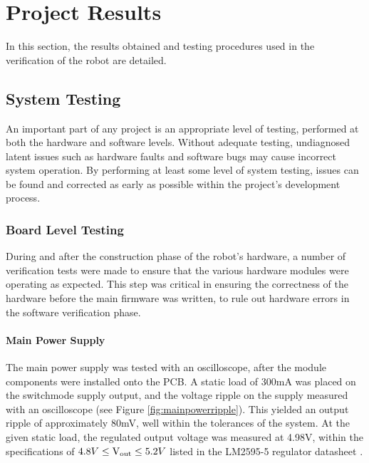 \chapter{Project Results}
\label{chp:results}

In this section, the results obtained and testing procedures used in the verification of the robot are detailed.

\section{System Testing}

An important part of any project is an appropriate level of testing, performed at both the hardware and software levels. Without adequate testing, undiagnosed latent issues such as hardware faults and software bugs may cause incorrect system operation. By performing at least some level of system testing, issues can be found and corrected as early as possible within the project's development process.

\subsection{Board Level Testing}

During and after the construction phase of the robot's hardware, a number of verification tests were made to ensure that the various hardware modules were operating as expected. This step was critical in ensuring the correctness of the hardware before the main firmware was written, to rule out hardware errors in the software verification phase.

\subsubsection{Main Power Supply}

The main power supply was tested with an oscilloscope, after the module components were installed onto the PCB. A static load of 300mA was placed on the switchmode supply output, and the voltage ripple on the supply measured with an oscilloscope (see Figure \ref{fig:mainpowerripple}). This yielded an output ripple of approximately 80mV, well within the tolerances of the system. At the given static load, the regulated output voltage was measured at 4.98V, within the specifications of \(4.8V\leq\text{V\ensuremath{_{\textrm{out}}}}\leq5.2V\) listed in the LM2595-5 regulator datasheet \cite{lm2595}.

